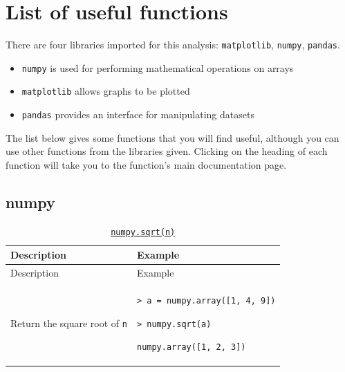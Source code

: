 \documentclass[10pt,a4paperpaper,]{article}
\date{}
\providecommand{\tightlist}{%
  \setlength{\itemsep}{0pt}\setlength{\parskip}{0pt}}
\begin{document}
\section{List of useful functions}\label{list-of-useful-functions}

There are four libraries imported for this analysis:
\texttt{matplotlib}, \texttt{numpy}, \texttt{pandas}.

\begin{itemize}
\tightlist
\item
  \texttt{numpy} is used for performing mathematical operations on
  arrays
\item
  \texttt{matplotlib} allows graphs to be plotted
\item
  \texttt{pandas} provides an interface for manipulating datasets
\end{itemize}

The list below gives some functions that you will find useful, although
you can use other functions from the libraries given. Clicking on the
heading of each function will take you to the function's main
documentation page.

\subsection{numpy}\label{numpy}

\begin{longtable}[]{@{}ll@{}}
\caption{\href{http://docs.scipy.org/doc/numpy/reference/generated/numpy.sqrt.html}{\texttt{numpy.sqrt(n)}}}\tabularnewline
\toprule
\begin{minipage}[b]{0.47\columnwidth}\raggedright\strut
Description\strut
\end{minipage} & \begin{minipage}[b]{0.47\columnwidth}\raggedright\strut
Example\strut
\end{minipage}\tabularnewline
\midrule
\endfirsthead
\toprule
\begin{minipage}[b]{0.47\columnwidth}\raggedright\strut
Description\strut
\end{minipage} & \begin{minipage}[b]{0.47\columnwidth}\raggedright\strut
Example\strut
\end{minipage}\tabularnewline
\midrule
\endhead
\begin{minipage}[t]{0.47\columnwidth}\raggedright\strut
Return the square root of \texttt{n}\strut
\end{minipage} & \begin{minipage}[t]{0.47\columnwidth}\raggedright\strut
\texttt{\textgreater{}\ a\ =\ numpy.array({[}1,\ 4,\ 9{]})}

\texttt{\textgreater{}\ numpy.sqrt(a)}

\texttt{numpy.array({[}1,\ 2,\ 3{]})}\strut
\end{minipage}\tabularnewline
\bottomrule
\end{longtable}
\end{document}
